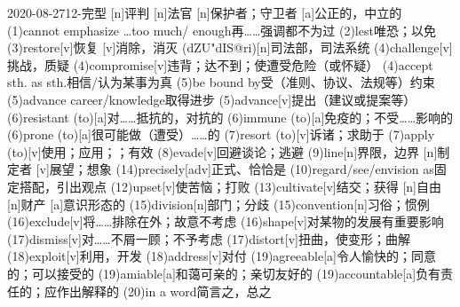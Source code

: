 \documentclass[12pt]{ctexart}
\begin{document}
\begin{wordlist}{2020-08-27}{12-完型}
  [n]{评判}
  [n]{法官}
  [n]{保护者；守卫者}
  [a]{公正的，中立的}
  \word(1){cannot emphasize \dots too much/ enough}{再……强调都不为过}
  \word(2){lest}{唯恐；以免}
  \word[2020-08-29](3){restore}[v]{恢复}
  [v]{消除，消灭}
  (dZU"dIS@ri)[n]{司法部，司法系统}
  \word(4){challenge}[v]{挑战，质疑}
  \word(4){compromise}[v]{违背；达不到；使遭受危险（或怀疑）}
  \word(4){accept sth. as sth.}{相信/认为某事为真}
  \word(5){be bound by}{受（准则、协议、法规等）约束}
  \word(5){advance career/knowledge}{取得进步}
  \word(5){advance}[v]{提出（建议或提案等）}
  \word(6){resistant (to)}[a]{对……抵抗的，对抗的}
  \word(6){immune (to)}[a]{免疫的；不受……影响的}
  \word[2020-08-29](6){prone (to)}[a]{很可能做（遭受）……的}
  \word(7){resort (to)}[v]{诉诸；求助于}
  \word(7){apply (to)}[v]{使用；应用；；有效}
  \word(8){evade}[v]{回避谈论；逃避}
  \word(9){line}[n]{界限，边界}
  [n]{制定者}
  [v]{展望；想象}
  \word(14){precisely}[adv]{正式、恰恰是}
  \word(10){regard/see/envision as}{固定搭配，引出观点}
  \word(12){upset}[v]{使苦恼；打败}
  \word(13){cultivate}[v]{结交；获得}
  [n]{自由}
  [n]{财产}
  [a]{意识形态的}
  \word(15){division}[n]{部门；分歧}
  \word(15){convention}[n]{习俗；惯例}
  \word(16){exclude}[v]{将……排除在外；故意不考虑}
  \word(16){shape}[v]{对某物的发展有重要影响}
  \word(17){dismiss}[v]{对……不屑一顾；不予考虑}
  \word[2020-08-29](17){distort}[v]{扭曲，使变形；曲解}
  \word[2020-08-29](18){exploit}[v]{利用，开发}
  \word(18){address}[v]{对付}
  \word(19){agreeable}[a]{令人愉快的；同意的；可以接受的}
  \word[2020-08-29](19){amiable}[a]{和蔼可亲的；亲切友好的}
  \word[2020-08-29](19){accountable}[a]{负有责任的；应作出解释的}
  \word(20){in a word}{简言之，总之}
\end{wordlist}
\end{document}
